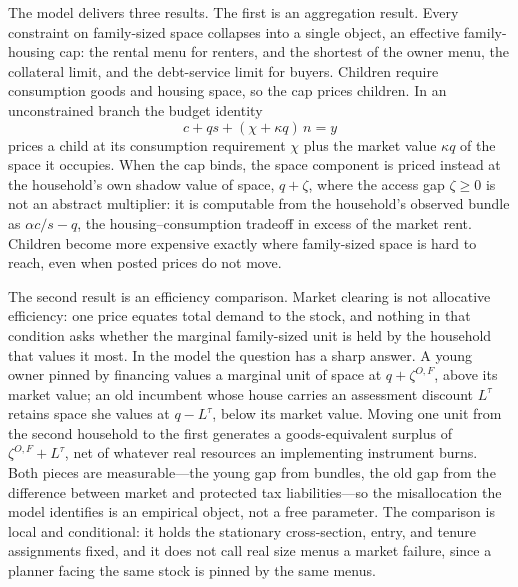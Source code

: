 \documentclass[11pt]{article}
\newcommand{\1}{\mathbf 1}
\begin{document}
The model delivers three results. The first is an aggregation result. Every constraint on family-sized space collapses into a single object, an effective family-housing cap: the rental menu for renters, and the shortest of the owner menu, the collateral limit, and the debt-service limit for buyers. Children require consumption goods and housing space, so the cap prices children. In an unconstrained branch the budget identity
\[
c+qs+(\chi+\kappa q)\,n=y
\]
prices a child at its consumption requirement $\chi$ plus the market value $\kappa q$ of the space it occupies. When the cap binds, the space component is priced instead at the household's own shadow value of space, $q+\zeta$, where the access gap $\zeta\ge0$ is not an abstract multiplier: it is computable from the household's observed bundle as $\alpha c/s-q$, the housing--consumption tradeoff in excess of the market rent. Children become more expensive exactly where family-sized space is hard to reach, even when posted prices do not move.

The second result is an efficiency comparison. Market clearing is not allocative efficiency: one price equates total demand to the stock, and nothing in that condition asks whether the marginal family-sized unit is held by the household that values it most. In the model the question has a sharp answer. A young owner pinned by financing values a marginal unit of space at $q+\zeta^{O,F}$, above its market value; an old incumbent whose house carries an assessment discount $L^\tau$ retains space she values at $q-L^\tau$, below its market value. Moving one unit from the second household to the first generates a goods-equivalent surplus of $\zeta^{O,F}+L^\tau$, net of whatever real resources an implementing instrument burns. Both pieces are measurable---the young gap from bundles, the old gap from the difference between market and protected tax liabilities---so the misallocation the model identifies is an empirical object, not a free parameter. The comparison is local and conditional: it holds the stationary cross-section, entry, and tenure assignments fixed, and it does not call real size menus a market failure, since a planner facing the same stock is pinned by the same menus.
\end{document}
